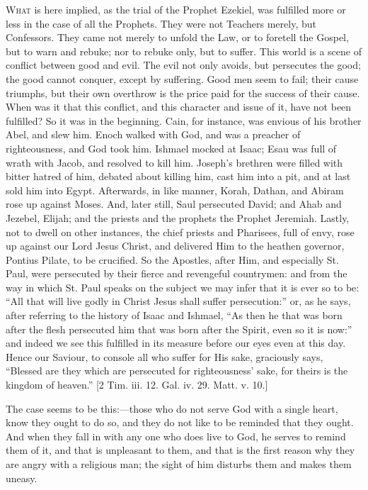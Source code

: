 W\textsc{hat} is here implied, as the trial of the Prophet Ezekiel, was
fulfilled more or less in the case of all the Prophets. They were not
Teachers merely, but Confessors. They came not merely to unfold the
Law, or to foretell the Gospel, but to warn and rebuke; nor to rebuke
only, but to suffer. This world is a scene of conflict between good
and evil. The evil not only avoids, but persecutes the good; the good
cannot conquer, except by suffering. Good men seem to fail; their
cause triumphs, but their own overthrow is the price paid for the
success of their cause. When was it that this conflict, and this
character and issue of it, have not been fulfilled? So it was in the
beginning. Cain, for instance, was envious of his brother Abel, and
slew him. Enoch walked with God, and was a preacher of righteousness,
and God took him. Ishmael mocked at Isaac; Esau was full of wrath with
Jacob, and resolved to kill him. Joseph's brethren were filled with
bitter hatred of him, debated about killing him, cast him into a pit,
and at last sold him into Egypt. Afterwards, in like manner, Korah,
Dathan, and Abiram rose up against Moses. And, later still, Saul
persecuted David; and Ahab and Jezebel, Elijah; and the priests and
the prophets the Prophet Jeremiah. Lastly, not to dwell on other
instances, the chief priests and Pharisees, full of envy, rose up
against our Lord Jesus Christ, and delivered Him to the heathen
governor, Pontius Pilate, to be crucified. So the Apostles, after Him,
and especially St. Paul, were persecuted by their fierce and
revengeful countrymen: and from the way in which St. Paul speaks on
the subject we may infer that it is ever so to be: ``All that will
live godly in Christ Jesus shall suffer persecution:'' or, as he
says, after referring to the history of Isaac and Ishmael, ``As
then he that was born after the flesh persecuted him that was born
after the Spirit, even so it is now:'' and indeed we see this
fulfilled in its measure before our eyes even at this day. Hence our
Saviour, to console all who suffer for His sake, graciously says,
``Blessed are they which are persecuted for righteousness' sake,
for theirs is the kingdom of heaven.'' [2 Tim. iii. 12. Gal. iv.
29. Matt. v. 10.]

The case seems to be this:—those who do not serve God with a
single heart, know they ought to do so, and they do not like to be
reminded that they ought. And when they fall in with any one who does
live to God, he serves to remind them of it, and that is unpleasant to
them, and that is the first reason why they are angry with a religious
man; the sight of him disturbs them and makes them uneasy.

